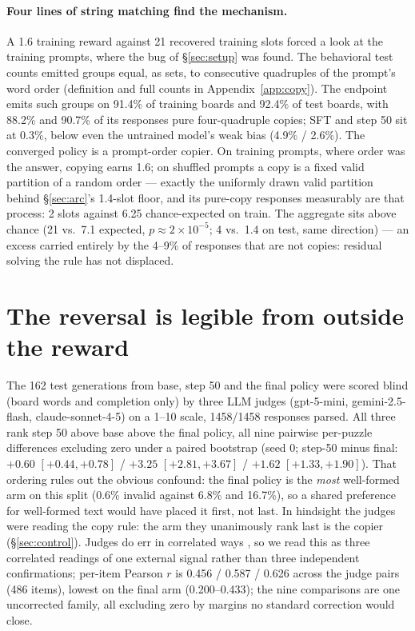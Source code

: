 \documentclass{article}
\begin{document}
\paragraph{Four lines of string matching find the mechanism.} A 1.6
training reward against 21 recovered training slots forced a look at the
training prompts, where the bug of \S\ref{sec:setup} was found. The behavioral test counts emitted groups
equal, as sets, to consecutive quadruples of the prompt's word order
(definition and full counts in Appendix~\ref{app:copy}). The endpoint emits
such groups on 91.4\% of training boards and 92.4\% of test boards, with
88.2\% and 90.7\% of its responses pure four-quadruple copies; SFT and
step 50 sit at 0.3\%, below even the untrained model's weak bias
(4.9\% / 2.6\%). The converged policy is a prompt-order copier. On training
prompts, where order was the answer, copying earns 1.6; on shuffled prompts
a copy is a fixed valid partition of a random order --- exactly the
uniformly drawn valid partition behind \S\ref{sec:arc}'s 1.4-slot floor,
and its pure-copy responses measurably are that process: 2 slots against
6.25 chance-expected on train. The aggregate sits above chance (21 vs.\
7.1 expected, $p \approx 2\times10^{-5}$; 4 vs.\ 1.4 on test, same
direction) --- an excess carried entirely by the 4--9\% of responses that
are not copies: residual solving the rule has not displaced.

\section{The reversal is legible from outside the reward}
\label{sec:judge}

The 162 test generations from base, step 50 and the final policy were
scored blind (board words and completion only) by
three LLM judges (gpt-5-mini, gemini-2.5-flash, claude-sonnet-4-5) on a
1--10 scale, 1458/1458 responses parsed. All three rank step 50 above base
above the final policy, all nine pairwise per-puzzle differences excluding
zero under a paired bootstrap (seed 0; step-50 minus final: $+0.60$
$[+0.44, +0.78]$ / $+3.25$ $[+2.81, +3.67]$ / $+1.62$ $[+1.33, +1.90]$).
That ordering rules out the obvious confound: the final policy is the
\emph{most} well-formed arm on this split (0.6\% invalid against 6.8\% and
16.7\%), so a shared preference for well-formed text would have placed it
first, not last. In hindsight the judges were reading the copy rule: the
arm they unanimously rank last is the copier (\S\ref{sec:control}).
Judges do err in
correlated ways \citep{kohli2026}, so we read this as three correlated
readings of one external signal rather than three independent
confirmations; per-item Pearson $r$ is 0.456 / 0.587 / 0.626 across the
judge pairs (486 items), lowest on the final arm (0.200--0.433); the nine
comparisons are one uncorrected family, all excluding zero by margins no
standard correction would close.
\end{document}
